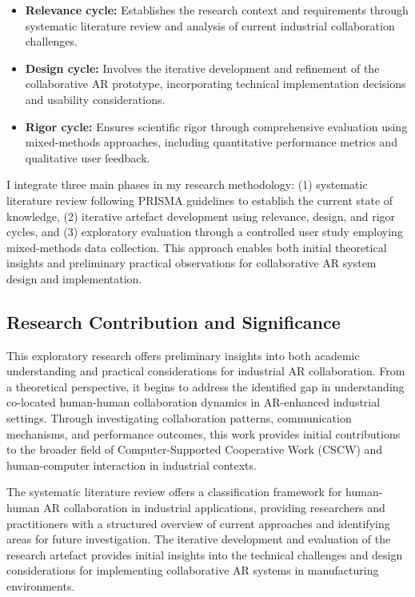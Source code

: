 \begin{itemize}
    \item \textbf{Relevance cycle:} Establishes the research context and requirements through systematic literature review and analysis of current industrial collaboration challenges.
    \item \textbf{Design cycle:} Involves the iterative development and refinement of the collaborative AR prototype, incorporating technical implementation decisions and usability considerations.
    \item \textbf{Rigor cycle:} Ensures scientific rigor through comprehensive evaluation using mixed-methods approaches, including quantitative performance metrics and qualitative user feedback.
\end{itemize}

I integrate three main phases in my research methodology: (1) systematic literature review following PRISMA guidelines to establish the current state of knowledge, (2) iterative artefact development using relevance, design, and rigor cycles, and (3) exploratory evaluation through a controlled user study employing mixed-methods data collection. This approach enables both initial theoretical insights and preliminary practical observations for collaborative AR system design and implementation.

\subsection{Research Contribution and Significance}
This exploratory research offers preliminary insights into both academic understanding and practical considerations for industrial AR collaboration. From a theoretical perspective, it begins to address the identified gap in understanding co-located human-human collaboration dynamics in AR-enhanced industrial settings. Through investigating collaboration patterns, communication mechanisms, and performance outcomes, this work provides initial contributions to the broader field of Computer-Supported Cooperative Work (CSCW) and human-computer interaction in industrial contexts.

The systematic literature review offers a classification framework for human-human AR collaboration in industrial applications, providing researchers and practitioners with a structured overview of current approaches and identifying areas for future investigation. The iterative development and evaluation of the research artefact provides initial insights into the technical challenges and design considerations for implementing collaborative AR systems in manufacturing environments.

